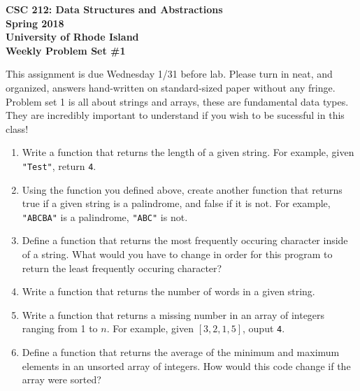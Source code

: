 \documentclass[11pt]{article}
\begin{document}
\thispagestyle{empty}

\begin{center}
    {\Large\bf CSC 212: Data Structures and Abstractions}\\
    \medskip
    {\Large\bf Spring 2018}\\
    \medskip
    {\Large\bf University of Rhode Island}\\
    \bigskip
    {\Large\bf Weekly Problem Set \#1}
\end{center}

\vspace{25pt}

This assignment is due Wednesday 1/31 before lab. Please turn in neat, and organized, answers hand-written on standard-sized paper without any fringe.  Problem set 1 is all about strings and arrays, these are fundamental data types. They are incredibly important to understand if you wish to be sucessful in this class! 

\begin{enumerate}[leftmargin=*]

\item Write a function that returns the length of a given string. For example, given \verb|"Test"|, return \verb|4|.

\item Using the function you defined above, create another function that returns true if a given string is a palindrome, and false if it is not. For example, \verb|"ABCBA"| is a palindrome, \verb|"ABC"| is not.

\item Define a function that returns the most frequently occuring character inside of a string. What would you have to change in order for this program to return the least frequently occuring character? 

\item Write a function that returns the number of words in a given string.


\item Write a function that returns a missing number in an array of integers ranging from 1 to $n$. For example, given $[3, 2, 1, 5]$, ouput \verb|4|. 

\item Define a function that returns the average of the minimum and maximum elements in an unsorted array of integers. How would this code change if the array were sorted?

\end{enumerate}
\end{document}

